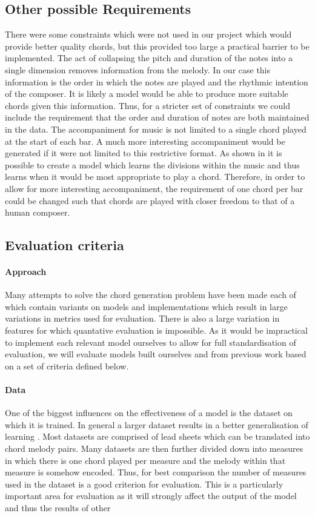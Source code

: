 \subsection{Other possible Requirements}

There were some constraints which were not used in our project which would provide better quality chords, but this provided too large a practical barrier to be implemented.
The act of collapsing the pitch and duration of the notes into a single dimension removes information from the melody.
In our case this information is the order in which the notes are played and the rhythmic intention of the composer.
It is likely a model would be able to produce more suitable chords given this information.
Thus, for a stricter set of constraints we could include the requirement that the order and duration of notes are both maintained in the data.
The accompaniment for music is not limited to a single chord played at the start of each bar.
A much more interesting accompaniment would be generated if it were not limited to this restrictive format.
As shown in \cite{ReinforcementLearning} it is possible to create a model which learns the divisions within the music and thus learns when it would be most appropriate to play a chord.
Therefore, in order to allow for more interesting accompaniment, the requirement of one chord per bar could be changed such that chords are played with closer freedom to that of a human composer.

\subsection{Evaluation criteria}
\paragraph{Approach}
Many attempts to solve the chord generation problem have been made each of which contain variants on models and implementations which result in large variations in metrics used for evaluation.
There is also a large variation in features for which quantative evaluation is impossible. 
As it would be impractical to implement each relevant model ourselves to allow for full standardisation of evaluation, we will evaluate models built ourselves and from previous work based on a set of criteria defined below.
\paragraph{Data}
One of the biggest influences on the effectiveness of a model is the dataset on which it is trained. 
In general a larger dataset results in a better generalisation of learning \cite{UnreasonableEffectivenessOfData}.
Most datasets are comprised of lead sheets which can be translated into chord melody pairs.
Many datasets are then further divided down into measures in which there is one chord played per measure and the melody within that measure is somehow encoded.
Thus, for best comparison the number of measures used in the dataset is a good criterion for evaluation.
This is a particularly important area for evaluation as it will strongly affect the output of the model and thus the results of other 

